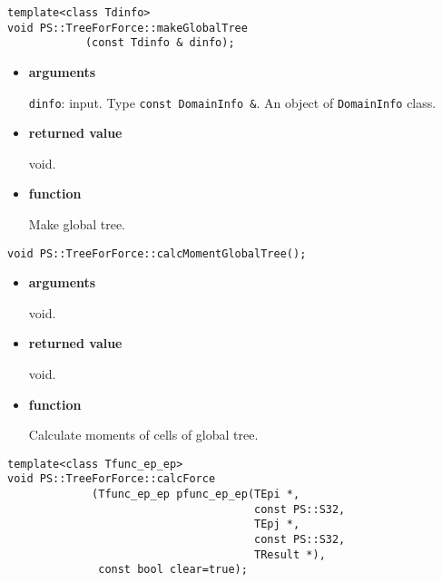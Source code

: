 
\begin{screen}
\begin{verbatim}
template<class Tdinfo>
void PS::TreeForForce::makeGlobalTree
            (const Tdinfo & dinfo);        
\end{verbatim}
\end{screen}

\begin{itemize}

\item {\bf arguments}

{\tt dinfo}: input. Type {\tt const DomainInfo \&}. An object of {\tt DomainInfo} class.

\item {\bf returned value}

void.

\item {\bf function}

Make global tree.

\end{itemize}


\begin{screen}
\begin{verbatim}
void PS::TreeForForce::calcMomentGlobalTree();
\end{verbatim}
\end{screen}

\begin{itemize}

\item {\bf arguments}

void.

\item {\bf returned value}

void.

\item {\bf function}

Calculate moments of cells of global tree.

\end{itemize}


\begin{screen}
\begin{verbatim}
template<class Tfunc_ep_ep>
void PS::TreeForForce::calcForce
             (Tfunc_ep_ep pfunc_ep_ep(TEpi *,
                                      const PS::S32,
                                      TEpj *,
                                      const PS::S32,
                                      TResult *),
              const bool clear=true);
\end{verbatim}
\end{screen}

